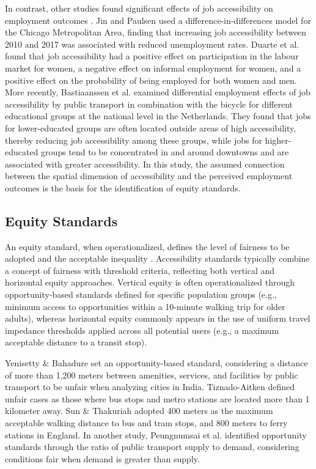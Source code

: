 \documentclass[preprint, 3p,
authoryear]{elsarticle} %
\begin{document}
In contrast, other studies found significant effects of job
accessibility on employment outcomes
\citep{bastiaanssen2021, duarte2023, jin2018, johnson2017, matas2010}.
Jin and Paulsen \citeyearpar{jin2018} used a difference-in-differences
model for the Chicago Metropolitan Area, finding that increasing job
accessibility between 2010 and 2017 was associated with reduced
unemployment rates. Duarte et al. \citeyearpar{duarte2023} found that
job accessibility had a positive effect on participation in the labour
market for women, a negative effect on informal employment for women,
and a positive effect on the probability of being employed for both
women and men. More recently, Bastiaanssen et al.
\citeyearpar{bastiaanssen2025} examined differential employment effects
of job accessibility by public transport in combination with the bicycle
for different educational groups at the national level in the
Netherlands. They found that jobs for lower-educated groups are often
located outside areas of high accessibility, thereby reducing job
accessibility among these groups, while jobs for higher-educated groups
tend to be concentrated in and around downtowns and are associated with
greater accessibility. In this study, the assumed connection between the
spatial dimension of accessibility and the perceived employment outcomes
is the basis for the identification of equity standards.

\subsection{Equity Standards}\label{equity-standards}

An equity standard, when operationalized, defines the level of fairness
to be adopted and the acceptable inequality \citep{soukhov2025a}.
Accessibility standards typically combine a concept of fairness with
threshold criteria, reflecting both vertical and horizontal equity
approaches. Vertical equity is often operationalized through
opportunity‑based standards defined for specific population groups
(e.g., minimum access to opportunities within a 10‑minute walking trip
for older adults), whereas horizontal equity commonly appears in the use
of uniform travel impedance thresholds applied across all potential
users (e.g., a maximum acceptable distance to a transit stop).

Yenisetty \& Bahadure \citeyearpar{yenisetty2020} set an
opportunity-based standard, considering a distance of more than 1,200
meters between amenities, services, and facilities by public transport
to be unfair when analyzing cities in India. Tiznado-Aitken
\citeyearpar{tiznado-aitken2018} defined unfair cases as those where bus
stops and metro stations are located more than 1 kilometer away. Sun \&
Thakuriah \citeyearpar{sun2021} adopted 400 meters as the maximum
acceptable walking distance to bus and tram stops, and 800 meters to
ferry stations in England. In another study, Peungnumsai et al.
\citep{peungnumsai2020} identified opportunity standards through the
ratio of public transport supply to demand, considering conditions fair
when demand is greater than supply.
\end{document}
